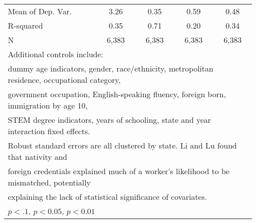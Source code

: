 \begin{table}[htbp]
\begin{tabular}{l*{4}{c}}
\midrule
Mean of Dep. Var.   &        3.26         &        0.35         &        0.59         &        0.48         \\
R-squared           &        0.35         &        0.71         &        0.20         &        0.34         \\
N                   &       6,383         &       6,383         &       6,383         &       6,383         \\
\bottomrule
\multicolumn{5}{l}{\footnotesize Additional controls include:}\\
\multicolumn{5}{l}{\footnotesize dummy age indicators, gender, race/ethnicity, metropolitan residence, occupational category,}\\
\multicolumn{5}{l}{\footnotesize government occupation, English-speaking fluency, foreign born, immigration by age 10,}\\
\multicolumn{5}{l}{\footnotesize STEM degree indicators, years of schooling, state and year interaction fixed effects.}\\
\multicolumn{5}{l}{\footnotesize Robust standard errors are all clustered by state. Li and Lu found that nativity and}\\
\multicolumn{5}{l}{\footnotesize foreign credentials explained much of a worker's likelihood to be mismatched, potentially}\\
\multicolumn{5}{l}{\footnotesize explaining the lack of statistical significance of covariates.}\\
\multicolumn{5}{l}{\footnotesize \sym{*} \(p<.1\), \sym{**} \(p<0.05\), \sym{***} \(p<0.01\)}\\
\end{tabular}
\end{table}
